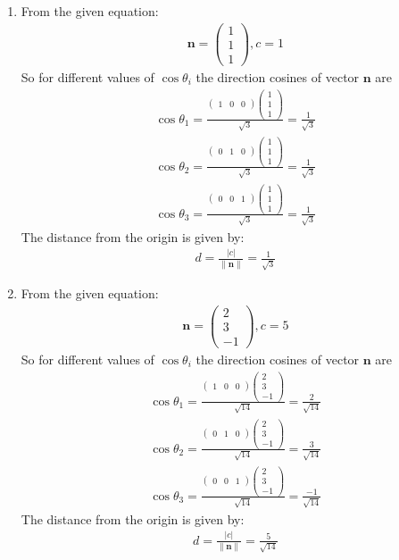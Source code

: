 \documentclass[12pt]{article}
\providecommand{\norm}[1]{\left\lVert#1\right\rVert}
\newcommand{\myvec}[1]{\ensuremath{\begin{pmatrix}#1\end{pmatrix}}}
\let\vec\mathbf
\begin{document}
\begin{enumerate}
\item From the given equation:
         \begin{align}
		\vec{n}=\myvec{1\\1\\1},c=1
			\end{align}
	So for different values of $\cos\theta_i$ the direction cosines of vector $\vec{n}$ are		
		\begin{align}
		\cos\theta_1=\frac{\myvec{1&0&0}\myvec{1 \\ 1\\1}}{\sqrt{3}}=\frac{1}{\sqrt{3}}\\
			\cos\theta_2=\frac{\myvec{0&1&0}\myvec{1 \\ 1\\1}}{\sqrt{3}}=\frac{1}{\sqrt{3}}\\
			\cos\theta_3=\frac{\myvec{0&0&1}\myvec{1\\1\\1}}{\sqrt{3}}=\frac{1}{\sqrt{3}}
		\end{align}
	The distance from the origin is given by:
		\begin{align}
			d=\frac{|c|}{\norm{\vec{n}}}=\frac{1}{\sqrt{3}}
		\end{align}

\item From the given equation:
         \begin{align}
		\vec{n}=\myvec{2\\3\\-1},c=5
			\end{align}
	So for different values of $\cos\theta_i$ the direction cosines of vector $\vec{n}$ are
		\begin{align}
		\cos\theta_1=\frac{\myvec{1&0&0}\myvec{2 \\ 3\\-1}}{\sqrt{14}}=\frac{2}{\sqrt{14}}\\
			\cos\theta_2=\frac{\myvec{0&1&0}\myvec{2 \\ 3\\-1}}{\sqrt{14}}=\frac{3}{\sqrt{14}}\\
			\cos\theta_3=\frac{\myvec{0&0&1}\myvec{2\\3\\-1}}{\sqrt{14}}=\frac{-1}{\sqrt{14}}
		\end{align}
	The distance from the origin is given by:
		\begin{align}
			d=\frac{|c|}{\norm{\vec{n}}}=\frac{5}{\sqrt{14}}
		\end{align}
		

\end{enumerate}
\end{document}
